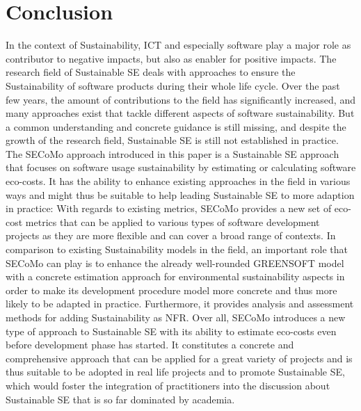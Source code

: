 \documentclass[oribibl]{llncs}
\begin{document}
\section{Conclusion}
In the context of Sustainability, ICT and especially software play a major role as contributor to negative impacts, but also as enabler for positive impacts. The research field of Sustainable SE deals with approaches to ensure the Sustainability of software products during their whole life cycle. Over the past few years, the amount of contributions to the field has significantly increased, and many approaches exist that tackle different aspects of software sustainability. But a common understanding and concrete guidance is still missing, and despite the growth of the research field, Sustainable SE is still not established in practice.\\
The SECoMo approach introduced in this paper is a Sustainable SE approach that focuses on software usage sustainability by estimating or calculating software eco-costs. It has the ability to enhance existing approaches in the field in various ways and might thus be suitable to help leading Sustainable SE to more adaption in practice: With regards to existing metrics, SECoMo provides a new set of eco-cost metrics that can be applied to various types of software development projects as they are more flexible and can cover a broad range of contexts. In comparison to existing Sustainability models in the field, an important role that SECoMo can play is to enhance the already well-rounded GREENSOFT model with a concrete estimation approach for environmental sustainability aspects in order to make its development procedure model more concrete and thus more likely to be adapted in practice. Furthermore, it provides analysis and assessment methods for adding Sustainability as NFR. Over all, SECoMo introduces a new type of approach to Sustainable SE with its ability to estimate eco-costs even before development phase has started. It constitutes a concrete and comprehensive approach that can be applied for a great variety of projects and is thus suitable to be adopted in real life projects and to promote Sustainable SE, which would foster the integration of practitioners into the discussion about Sustainable SE that is so far dominated by academia.\\ %
\end{document}
